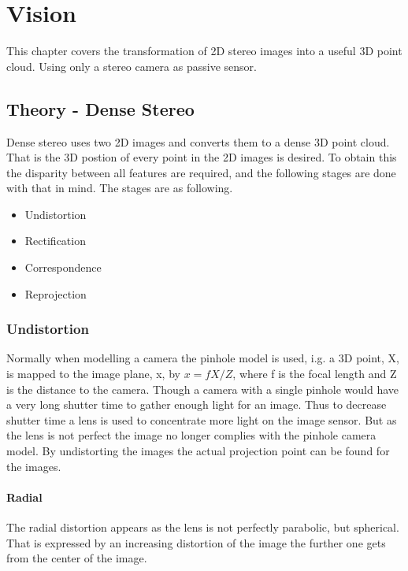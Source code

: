 \chapter{Vision}


This chapter covers the transformation of 2D stereo images into a useful 3D point cloud. Using only a stereo camera as passive sensor.

\section{Theory - Dense Stereo}

Dense stereo uses two 2D images and converts them to a dense 3D point cloud. That is the 3D postion of every point in the 2D images is desired. To obtain this the disparity between all features are required, and the following stages are done with that in mind. The stages are as following.

\begin{itemize}
  \item Undistortion
  \item Rectification
  \item Correspondence
  \item Reprojection
\end{itemize}


\subsection{Undistortion}

Normally when modelling a camera the pinhole model is used, i.g. a 3D point, X, is mapped to the image plane, x, by $ x = f X/Z $, where f is the focal length and Z is the distance to the camera. Though a camera with a single pinhole would have a very long shutter time to gather enough light for an image. Thus to decrease shutter time a lens is used to concentrate more light on the image sensor. But as the lens is not perfect the image no longer complies with the pinhole camera model. By undistorting the images the actual projection point can be found for the images. 

\subsubsection{Radial}

The radial distortion appears as the lens is not perfectly parabolic, but spherical. That is expressed by an increasing distortion of the image the further one gets from the center of the image. 


